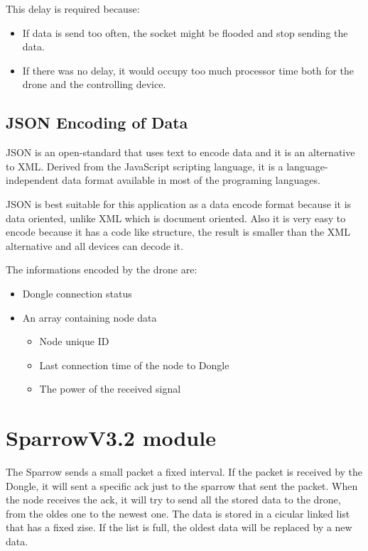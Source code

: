 This delay is required because:
\begin{itemize}

\item If data is send too often, the socket might be flooded and stop sending the data. %
\item If there was no delay, it would occupy too much processor time both for the drone and the controlling device.

\end{itemize}

\subsection{JSON Encoding of Data} \cite{json}

JSON is an open-standard that uses text to encode data and it is an alternative to XML. Derived from the JavaScript scripting language, it is a language-independent data format available in most of the programing languages.

JSON is best suitable for this application as a data encode format because it is data oriented, unlike XML which is document oriented. Also it is very easy to encode because it has a code like structure, the result is smaller than the XML alternative and all devices can decode it. 

The informations encoded by the drone are:
\begin{itemize}

\item Dongle connection status
\item An array containing node data
\begin{itemize}

	\item Node unique ID
	\item Last connection time of the node to Dongle
	\item The power of the received signal

	\end{itemize}
\end{itemize}
 

\section{SparrowV3.2 module}

The Sparrow sends a small packet a fixed interval. If the packet is received by the Dongle, it will sent a specific ack just to the sparrow that sent the packet. When the node receives the ack, it will try to send all the stored data to the drone, from the oldes one to the newest one. The data is stored in a cicular linked list that has a fixed zise. If the list is full, the oldest data will be replaced by a new data.


